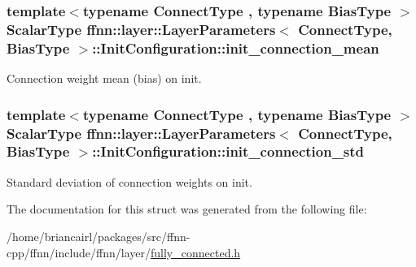 \hypertarget{structffnn_1_1layer_1_1_layer_parameters_1_1_init_configuration_ab89ad5ae8ddd69c7eb55e14ca6c59186}{
\subsubsection[{init\-\_\-connection\-\_\-mean}]{\setlength{\rightskip}{0pt plus 5cm}template$<$typename Connect\-Type , typename Bias\-Type $>$ {\bf Scalar\-Type} {\bf ffnn\-::layer\-::\-Layer\-Parameters}$<$ Connect\-Type, Bias\-Type $>$\-::Init\-Configuration\-::init\-\_\-connection\-\_\-mean}}\label{structffnn_1_1layer_1_1_layer_parameters_1_1_init_configuration_ab89ad5ae8ddd69c7eb55e14ca6c59186}


Connection weight mean (bias) on init. 

\hypertarget{structffnn_1_1layer_1_1_layer_parameters_1_1_init_configuration_ad8f3d53cb4491d2db5378d929bddfcb6}{
\subsubsection[{init\-\_\-connection\-\_\-std}]{\setlength{\rightskip}{0pt plus 5cm}template$<$typename Connect\-Type , typename Bias\-Type $>$ {\bf Scalar\-Type} {\bf ffnn\-::layer\-::\-Layer\-Parameters}$<$ Connect\-Type, Bias\-Type $>$\-::Init\-Configuration\-::init\-\_\-connection\-\_\-std}}\label{structffnn_1_1layer_1_1_layer_parameters_1_1_init_configuration_ad8f3d53cb4491d2db5378d929bddfcb6}


Standard deviation of connection weights on init. 



The documentation for this struct was generated from the following file\-:\begin{DoxyCompactItemize}
\item 
/home/briancairl/packages/src/ffnn-\/cpp/ffnn/include/ffnn/layer/\hyperlink{fully__connected_8h}{fully\-\_\-connected.\-h}\end{DoxyCompactItemize}
